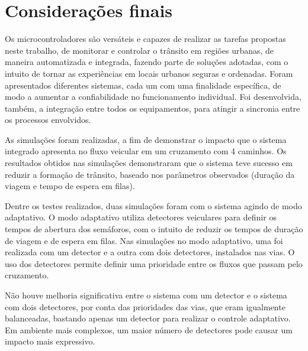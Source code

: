 \chapter{Considerações finais}

Os microcontroladores são versáteis e capazes de realizar as tarefas propostas neste trabalho, de monitorar e controlar o trânsito em regiões urbanas, de maneira automatizada e integrada, fazendo parte de soluções adotadas, com o intuito de tornar as experiências em locais urbanos seguras e ordenadas.
Foram apresentados diferentes sistemas, cada um com uma finalidade específica, de modo a aumentar a confiabilidade no funcionamento individual. Foi desenvolvida, também, a integração entre todos os equipamentos, para atingir a sincronia entre os processos envolvidos.

As simulações foram realizadas, a fim de demonstrar o impacto que o sistema integrado apresenta no fluxo veicular em um cruzamento com 4 caminhos. Os resultados obtidos nas simulações demonstraram que o sistema teve sucesso em reduzir a formação de trânsito, baseado nos parâmetros observados (duração da viagem e tempo de espera em filas).

Dentre os testes realizados, duas simulações foram com o sistema agindo de modo adaptativo. O modo adaptativo utiliza detectores veiculares para definir os tempos de abertura dos semáforos, com o intuito de reduzir os tempos de duração de viagem e de espera em filas. Nas simulações no modo adaptativo, uma foi realizada com um detector e a outra com dois detectores, instalados nas vias. O uso dos detectores permite definir uma prioridade entre os fluxos que passam pelo cruzamento.

Não houve melhoria significativa entre o sistema com um detector e o sistema com dois detectores, por conta das prioridades das vias, que eram igualmente balanceadas, bastando apenas um detector para realizar o controle adaptativo. Em ambiente mais complexos, um maior número de detectores pode causar um impacto mais expressivo. 



